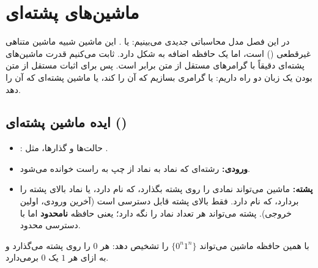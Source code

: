 \chapter{ماشین‌های پشته‌ای}

در این فصل مدل محاسباتی جدیدی می‌بینیم:  یا . این ماشین شبیه ماشین متناهی غیرقطعی () است، اما یک حافظه اضافه به شکل  دارد. ثابت می‌کنیم قدرت ماشین‌های پشته‌ای دقیقاً با گرامرهای مستقل از متن برابر است. پس برای اثبات مستقل از متن بودن یک زبان دو راه داریم: یا گرامری بسازیم که آن را  کند، یا ماشین پشته‌ای که آن را  دهد.

\section{ایده ماشین پشته‌ای ()}

\begin{ltrfig}
\end{ltrfig}

\begin{itemize}
\item {}: حالت‌ها و گذارها، مثل .
\item \textbf{ورودی:} رشته‌ای که نماد به نماد از چپ به راست خوانده می‌شود.
\item \textbf{پشته:} ماشین می‌تواند نمادی را روی پشته بگذارد، که  نام دارد، یا نماد بالای پشته را بردارد، که  نام دارد. فقط بالای پشته قابل دسترسی است (آخرین ورودی، اولین خروجی). پشته می‌تواند هر تعداد نماد را نگه دارد؛ یعنی حافظه \textbf{نامحدود} اما با دسترسی محدود.
\end{itemize}

با همین حافظه ماشین می‌تواند $\{0^n1^n\}$ را تشخیص دهد: هر $0$ را روی پشته می‌گذارد و به ازای هر $1$ یک $0$ برمی‌دارد.

